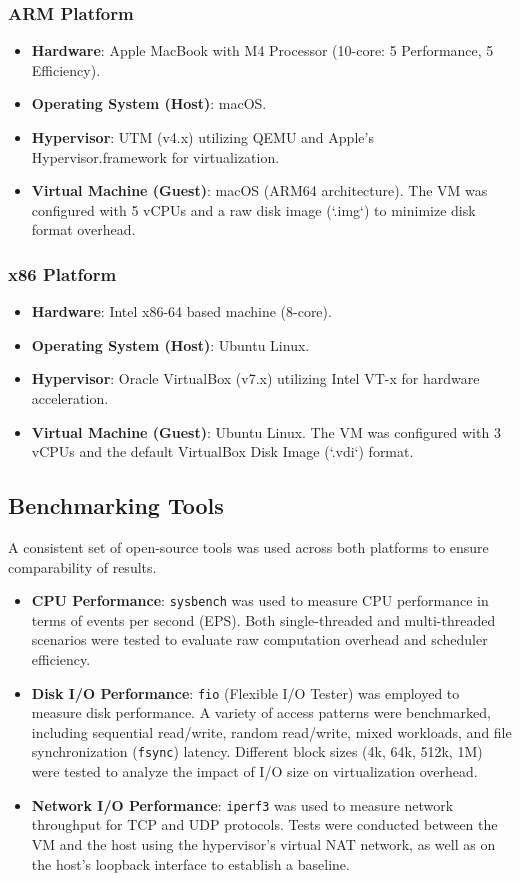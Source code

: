 \documentclass[conference]{IEEEtran}
\begin{document}
\subsubsection{ARM Platform}
\begin{itemize}
    \item \textbf{Hardware}: Apple MacBook with M4 Processor (10-core: 5 Performance, 5 Efficiency).
    \item \textbf{Operating System (Host)}: macOS.
    \item \textbf{Hypervisor}: UTM (v4.x) utilizing QEMU and Apple's Hypervisor.framework for virtualization.
    \item \textbf{Virtual Machine (Guest)}: macOS (ARM64 architecture). The VM was configured with 5 vCPUs and a raw disk image (`.img`) to minimize disk format overhead.
\end{itemize}

\subsubsection{x86 Platform}
\begin{itemize}
    \item \textbf{Hardware}: Intel x86-64 based machine (8-core).
    \item \textbf{Operating System (Host)}: Ubuntu Linux.
    \item \textbf{Hypervisor}: Oracle VirtualBox (v7.x) utilizing Intel VT-x for hardware acceleration.
    \item \textbf{Virtual Machine (Guest)}: Ubuntu Linux. The VM was configured with 3 vCPUs and the default VirtualBox Disk Image (`.vdi`) format.
\end{itemize}

\subsection{Benchmarking Tools}
A consistent set of open-source tools was used across both platforms to ensure comparability of results.

\begin{itemize}
    \item \textbf{CPU Performance}: \texttt{sysbench} was used to measure CPU performance in terms of events per second (EPS). Both single-threaded and multi-threaded scenarios were tested to evaluate raw computation overhead and scheduler efficiency.
    \item \textbf{Disk I/O Performance}: \texttt{fio} (Flexible I/O Tester) was employed to measure disk performance. A variety of access patterns were benchmarked, including sequential read/write, random read/write, mixed workloads, and file synchronization (\texttt{fsync}) latency. Different block sizes (4k, 64k, 512k, 1M) were tested to analyze the impact of I/O size on virtualization overhead.
    \item \textbf{Network I/O Performance}: \texttt{iperf3} was used to measure network throughput for TCP and UDP protocols. Tests were conducted between the VM and the host using the hypervisor's virtual NAT network, as well as on the host's loopback interface to establish a baseline.
\end{itemize}
\end{document}

